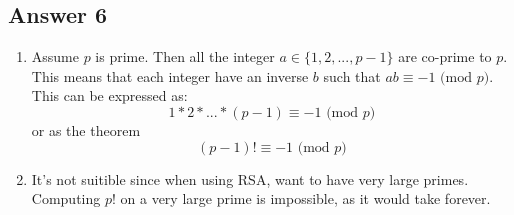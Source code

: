 \documentclass{article}
\begin{document}
	\subsection*{Answer 6}
	\renewcommand{\theenumi}{\alph{enumi}}
	\begin{enumerate}
		\item Assume $p$ is prime. Then all the integer $a \in \{1,2,...,p-1\}$ are co-prime to $p$. This means that each integer have an inverse $b$ such that $ab \equiv -1 \text{ (mod $p$)}$. This can be expressed as:
		$$
		1*2*...*(p-1) \equiv -1 \text{ (mod $p$)}
		$$
		or as the theorem
		$$
		(p-1)! \equiv -1 \text{ (mod $p$)}
		$$
		
		\item It's not suitible since when using RSA, want to have very large primes. Computing $p!$ on a very large prime is impossible, as it would take forever.
	\end{enumerate}	
\end{document}
